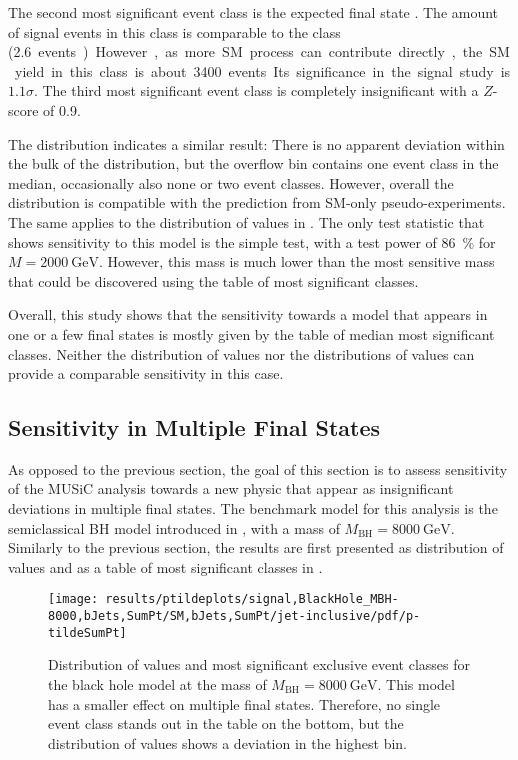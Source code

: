 The second most significant event class is the expected final state . The amount of signal events in this class is comparable to the  class (\SI{2.6} events). However, as more \ac{SM} process can contribute directly, the \ac{SM} yield in this class is about \num{3400} events. Its significance in the signal study is $\num{1.1}\sigma$. 
The third most significant event class is completely insignificant with a $Z$-score of \num{0.9}.

The \ptilde distribution indicates a similar result: There is no apparent deviation within the bulk of the distribution, but the overflow bin contains one event class in the median, occasionally also none or two event classes. However, overall the distribution is compatible with the prediction from \ac{SM}-only pseudo-experiments.
The same applies to the distribution of \TSphat values in . The only test statistic that shows sensitivity to this model is the simple test, with a test power of \SI{86}{\percent} for $M = \SI{2000}{\GeV}$. However, this mass is much lower than the most sensitive mass that could be discovered using the table of most significant classes.

\enlargethispage{1em}

Overall, this study shows that the sensitivity towards a model that appears in one or a few final states is mostly given by the table of median most significant classes. Neither the distribution of \ptilde values nor the distributions of \TSphat values can provide a comparable sensitivity in this case.

\subsection{Sensitivity in Multiple Final States}
As opposed to the previous section, the goal of this section is to assess sensitivity of the \ac{MUSiC} analysis towards a new physic that appear as insignificant deviations in multiple final states. The benchmark model for this analysis is the semiclassical \acl{BH} model introduced in , with a mass of $M_\text{BH} = \SI{8000}{\GeV}$.
Similarly to the previous section, the results are first presented as distribution of \ptilde values and as a table of most significant classes in .

\begin{figure}[p]
    \centering
    \texttt{[image: results/ptildeplots/signal,BlackHole\_MBH-8000,bJets,SumPt/SM,bJets,SumPt/jet-inclusive/pdf/p-tildeSumPt]}
    {
        
    }
    \caption{Distribution of \ptilde values and most significant exclusive event classes for the black hole model at the mass of $M_\text{BH} = \SI{8000}{\GeV}$. This model has a smaller effect on multiple final states. Therefore, no single event class stands out in the table on the bottom, but the distribution of \ptilde values shows a deviation in the highest bin.}
    \label{fig:multiple_final_states}
\end{figure}

